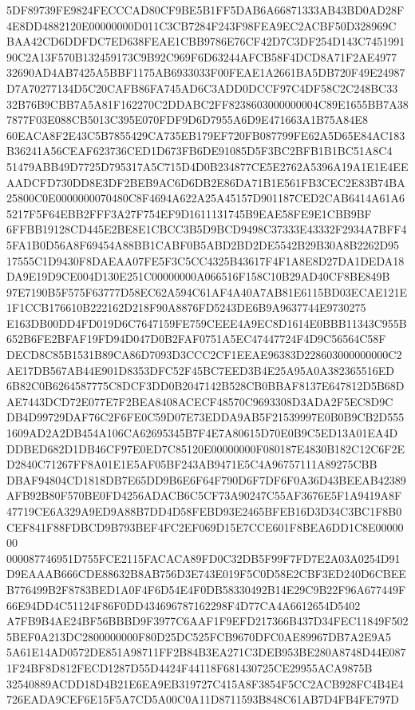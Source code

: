 \documentclass[UTF8,fontset=fandol,zihao=-4,a4paper]{ctexart}
\begin{document}
{{5DF89739FE9824FECCCAD80CF9BE5B1FF5DAB6A66871333AB43BD0AD28F4E8DD4882120E00000000D011C3CB7284F243F98FEA9EC2ACBF50D328969C
BAA42CD6DDFDC7ED638FEAE1CBB9786E76CF42D7C3DF254D143C745199190C2A13F570B132459173C9B92C969F6D63244AFCB58F4DCD8A71F2AE4977
32690AD4AB7425A5BBF1175AB6933033F00FEAE1A2661BA5DB720F49E24987D7A70277134D5C20CAFB86FA745AD6C3ADD0DCCF97C4DF58C2C248BC33
32B76B9CBB7A5A81F162270C2DDABC2FF8238603000000004C89E1655BB7A387877F03E088CB5013C395E070FDF9D6D7955A6D9E471663A1B75A84E8
60EACA8F2E43C5B7855429CA735EB179EF720FB087799FE62A5D65E84AC183B36241A56CEAF623736CED1D673FB6DE91085D5F3BC2BFB1B1BC51A8C4
51479ABB49D7725D795317A5C715D4D0B234877CE5E2762A5396A19A1E1E4EEAADCFD730DD8E3DF2BEB9AC6D6DB2E86DA71B1E561FB3CEC2E83B74BA
25800C0E0000000070480C8F4694A622A25A45157D901187CED2CAB6414A61A65217F5F64EBB2FFF3A27F754EF9D1611131745B9EAE58FE9E1CBB9BF
6FFBB19128CD445E2BE8E1CBCC3B5D9BCD9498C37333E43332F2934A7BFF45FA1B0D56A8F69454A88BB1CABF0B5ABD2BD2DE5542B29B30A8B2262D95
17555C1D9430F8DAEAA07FE5F3C5CC4325B43617F4F1A8E8D27DA1DEDA18DA9E19D9CE004D130E251C00000000A066516F158C10B29AD40CF8BE849B
97E7190B5F575F63777D58EC62A594C61AF4A40A7AB81E6115BD03ECAE121E1F1CCB176610B222162D218F90A8876FD5243DE6B9A9637744E9730275
E163DB00DD4FD019D6C7647159FE759CEEE4A9EC8D1614E0BBB11343C955B652B6FE2BFAF19FD94D047D0B2FAF0751A5EC47447724F4D9C56564C58F
DECD8C85B1531B89CA86D7093D3CCC2CF1EEAE96383D228603000000000C2AE17DB567AB44E901D8353DFC52F45BC7EED3B4E25A95A0A382365516ED
6B82C0B6264587775C8DCF3DD0B2047142B528CB0BBAF8137E647812D5B68DAE7443DCD72E077E7F2BEA8408ACECF48570C9693308D3ADA2F5EC8D9C
DB4D99729DAF76C2F6FE0C59D07E73EDDA9AB5F21539997E0B0B9CB2D5551609AD2A2DB454A106CA62695345B7F4E7A80615D70E0B9C5ED13A01EA4D
DDBED682D1DB46CF97E0ED7C85120E00000000F080187E4830B182C12C6F2ED2840C71267FF8A01E1E5AF05BF243AB9471E5C4A96757111A89275CBB
DBAF94804CD1818DB7E65DD9B6E6F64F790D6F7DF6F0A36D43BEEAB42389AFB92B80F570BE0FD4256ADACB6C5CF73A90247C55AF3676E5F1A9419A8F
47719CE6A329A9ED9A88B7DD4D58FEBD93E2465BFEB16D3D34C3BC1F8B0CEF841F88FDBCD9B793BEF4FC2EF069D15E7CCE601F8BEA6DD1C8E0000000
000087746951D755FCE2115FACACA89FD0C32DB5F99F7FD7E2A03A0254D91D9EAAAB666CDE88632B8AB756D3E743E019F5C0D58E2CBF3ED240D6CBEE
B776499B2F8783BED1A0F4F6D54E4F0DB58330492B14E29C9B22F96A677449F66E94DD4C51124F86F0DD434696787162298F4D77CA4A6612654D5402
A7FB9B4AE24BF56BBBD9F3977C6AAF1F9EFD217366B437D34FEC11849F5025BEF0A213DC2800000000F80D25DC525FCB9670DFC0AE89967DB7A2E9A5
5A61E14AD0572DE851A98711FF2B84B3EA271C3DEB953BE280A8748D44E0871F24BF8D812FECD1287D55D4424F44118F681430725CE29955ACA9875B
32540889ACDD18D4B21E6EA9EB319727C415A8F3854F5CC2ACB928FC4B4E4726EADA9CEF6E15F5A7CD5A00C0A11D8711593B848C61AB7D4FB4FE797D
}}
\end{document}
